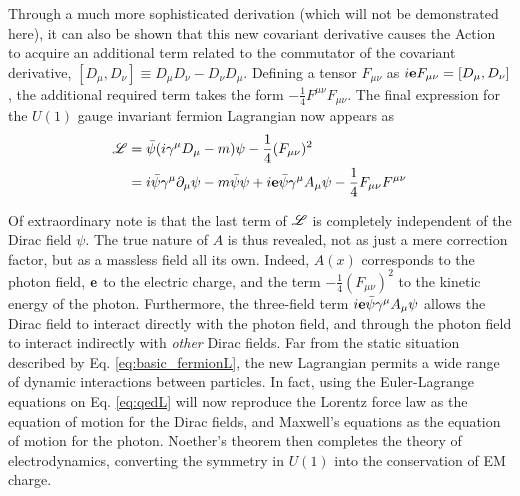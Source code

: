    Through a much more sophisticated derivation (which will not be demonstrated here),
        it can also be shown that this new covariant derivative causes the Action to acquire an additional term 
        related to the commutator of the covariant derivative, $[D_\mu, D_\nu] \equiv D_\mu D_\nu - D_\nu D_\mu$.
    Defining a tensor $F_{\mu\nu}$ as $i\mathbf{e} F_{\mu\nu} = [D_\mu, D_\nu]$,
        the additional required term takes the form $-\frac{1}{4}F^{\mu\nu}F_{\mu\nu}$.
    The final expression for the $U(1)$ gauge invariant fermion Lagrangian now appears as
    \begin{equation} \label{eq:qedL} \begin{split}
        \mathscr{L} &= \bar{\psi} (i\gamma^\mu D_\mu - m) \psi - \frac{1}{4}(F_{\mu\nu})^2
        \\&= i \bar{\psi} \gamma^\mu \partial_\mu \psi
            - m \bar{\psi} \psi
            + i \mathbf{e} \bar{\psi} \gamma^\mu A_\mu \psi
            - \frac{1}{4}F_{\mu\nu}F^{\mu\nu}
    \end{split} \end{equation}

    Of extraordinary note is that the last term of $\mathscr{L}$ is completely independent of the Dirac field $\psi$.
    The true nature of $A$ is thus revealed, not as just a mere correction factor,
        but as a massless field all its own.
    Indeed, $A(x)$ corresponds to the photon field, $\mathbf{e}$ to the electric charge,
        and the term $-\frac{1}{4}(F_{\mu\nu})^2$ to the kinetic energy of the photon.
    Furthermore, the three-field term $i \mathbf{e} \bar{\psi} \gamma^\mu A_\mu \psi$
        allows the Dirac field to interact directly with the photon field,
        and through the photon field to interact indirectly with \textit{other} Dirac fields.
    Far from the static situation described by Eq. \ref{eq:basic_fermionL},
        the new Lagrangian permits a wide range of dynamic interactions between particles.
    In fact, using the Euler-Lagrange equations on Eq. \ref{eq:qedL}
        will now reproduce the Lorentz force law as the equation of motion for the Dirac fields,
        and Maxwell's equations as the equation of motion for the photon.
    Noether's theorem then completes the theory of electrodynamics, 
        converting the symmetry in $U(1)$ into the conservation of EM charge.

